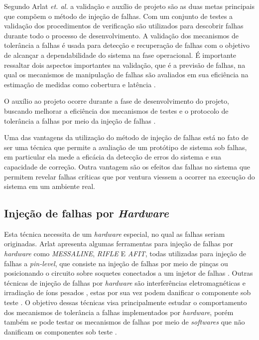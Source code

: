 Segundo Arlat \textit{et. al.} \cite{Arlat:1990} a validação e auxílio de projeto são as duas metas principais que compõem o método de injeção de falhas. Com um conjunto de testes a validação dos procedimentos de verificação são utilizados para descobrir falhas durante todo o processo de desenvolvimento. A validação dos mecanismos de tolerância a falhas é usada para detecção e recuperação de falhas com o objetivo de alcançar a dependabilidade do sistema na fase operacional. É importante ressaltar dois aspectos importantes na validação, que é a previsão de falhas, na qual os mecanismos de manipulação de falhas são avaliados em sua eficiência na estimação de medidas como cobertura e latência \cite{Arlat:1990}.

O auxílio ao projeto ocorre durante a fase de desenvolvimento do projeto, buscando melhorar a eficiência dos mecanismos de testes e o protocolo de tolerância a falhas por meio da injeção de falhas \cite{Arlat:1990}.

Uma das vantagens da utilização do método de injeção de falhas está no fato de ser uma técnica que permite a avaliação de um protótipo de sistema sob falhas, em particular ela mede a eficácia da detecção de erros do sistema e sua capacidade de correção. Outra vantagem são os efeitos das falhas no sistema que permitem revelar falhas críticas que por ventura viessem a ocorrer na execução do sistema em um ambiente real\cite{Arlat:2003}.     

\subsection{Injeção de falhas por \textit{Hardware}}

Esta técnica necessita de um \textit{hardware} especial, no qual as falhas seriam originadas. Arlat \cite{Arlat:2003} apresenta algumas ferramentas para injeção de falhas por \textit{hardware} como \textit{MESSALINE}, \textit{RIFLE} E \textit{AFIT}, todas utilizadas para injeção de falhas a \textit{pin-level}, que consiste na injeção de falhas por meio de pinças ou posicionando o circuito sobre soquetes conectados a um injetor de falhas \cite{Arlat:1990, Arlat:2003}. Outras técnicas de injeção de falhas por \textit{hardware} são interferências eletromagnéticas e irradiação de íons pesados \cite{Gunnelo:1989, Arlat:1990, Arlat:2003}, estas por sua vez podem danificar o componente sob teste \cite{Sotoma:1997}. O objetivo dessas técnicas visa principalmente estudar o comportamento dos mecanismos de tolerância a falhas implementados por \textit{hardware}, porém também se pode testar os mecanismos de falhas por meio de \textit{softwares} que não danificam os componentes sob teste \cite{Martins:1989}.


